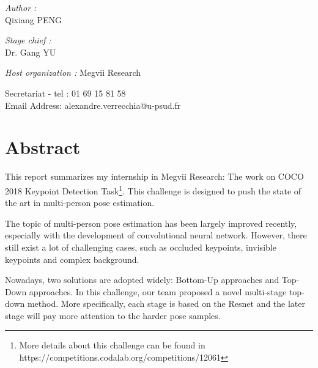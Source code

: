 \documentclass[oneside]{memoir}
\begin{document}
\begin{titlingpage}
\begin{center}
\begin{minipage}{0.4\textwidth}
\begin{flushleft} \large
\emph{Author :}\\
Qixiang \textsc{PENG}
\end{flushleft}
\end{minipage}
\begin{minipage}{0.4\textwidth}
\begin{flushright} \large
\emph{Stage chief :} \\
Dr. Gang \textsc{YU}
\end{flushright}
\end{minipage}
\vfill
\emph{Host organization : }
Megvii Research


\vfill



{Secretariat - tel : 01 69 15 81 58\\
Email Address: alexandre.verrecchia@u-psud.fr\\
}
\end{center}

\end{titlingpage}



\tableofcontents

\newpage
\thispagestyle{empty}%
\newpage

\chapter*{Abstract}

This report summarizes my internship in Megvii Research: The work on COCO 2018 Keypoint Detection Task\footnote{ More details about this challenge can be found in https://competitions.codalab.org/competitions/12061}.
This challenge is designed to push the state of the art in multi-person pose estimation.

The topic of multi-person pose estimation has been largely improved recently, especially with the development of convolutional neural network.
However, there still exist a lot of challenging cases, such as occluded keypoints, invisible keypoints and complex background.

Nowadays, two solutions are adopted widely: Bottom-Up approaches and Top-Down approaches.
In this challenge, our team proposed a novel multi-stage top-down method.
More specifically, each stage is based on the Resnet and the later stage will pay more attention to the harder pose samples.
\end{document}
